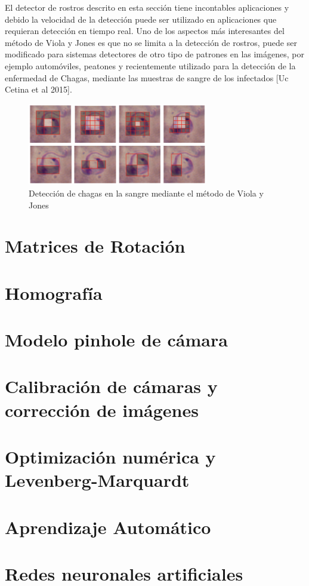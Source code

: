    El detector de rostros descrito en esta sección tiene incontables aplicaciones y debido la velocidad de la detección puede ser utilizado en aplicaciones que requieran detección en tiempo real. Uno de los aspectos más interesantes del método de Viola y Jones es que no se limita a la detección de rostros, puede ser modificado para sistemas detectores de otro tipo de patrones en las imágenes, por ejemplo automóviles, peatones y recientemente utilizado para la detección de la enfermedad de Chagas, mediante las muestras de sangre de los infectados [Uc Cetina et al 2015].
   \begin{figure}[htbp]
   	\centering
   	\includegraphics[width=0.7\textwidth]{./pictures/chagas}
   	\caption{Detección de chagas en la sangre mediante el método de Viola y Jones}\label{fig: figura}
   \end{figure}
   
   \section{Matrices de Rotación}
   \section{Homografía}
   \section{Modelo pinhole de cámara}
   \section{Calibración de cámaras y corrección de imágenes}
   \section{Optimización numérica y Levenberg-Marquardt}
   \section{Aprendizaje Automático}
   \section{Redes neuronales artificiales}

